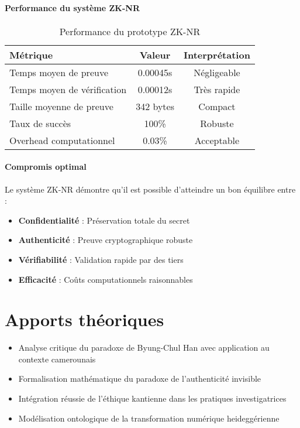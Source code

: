 \documentclass[12pt,a4paper]{article}
\begin{document}
\paragraph{Performance du système ZK-NR}
\begin{table}[H]
\centering
\begin{tabular}{|l|c|c|}
\hline
\textbf{Métrique} & \textbf{Valeur} & \textbf{Interprétation} \\
\hline
Temps moyen de preuve & 0.00045s & Négligeable \\
\hline
Temps moyen de vérification & 0.00012s & Très rapide \\
\hline
Taille moyenne de preuve & 342 bytes & Compact \\
\hline
Taux de succès & 100\% & Robuste \\
\hline
Overhead computationnel & 0.03\% & Acceptable \\
\hline
\end{tabular}
\caption{Performance du prototype ZK-NR}
\end{table}

\paragraph{Compromis optimal}
Le système ZK-NR démontre qu'il est possible d'atteindre un bon équilibre entre :
\begin{itemize}
\item \textbf{Confidentialité} : Préservation totale du secret
\item \textbf{Authenticité} : Preuve cryptographique robuste  
\item \textbf{Vérifiabilité} : Validation rapide par des tiers
\item \textbf{Efficacité} : Coûts computationnels raisonnables
\end{itemize}


\section{Apports théoriques}
\begin{itemize}
\item Analyse critique du paradoxe de Byung-Chul Han avec application au contexte camerounais
\item Formalisation mathématique du paradoxe de l'authenticité invisible
\item Intégration réussie de l'éthique kantienne dans les pratiques investigatrices
\item Modélisation ontologique de la transformation numérique heideggérienne
\end{itemize}
\end{document}

